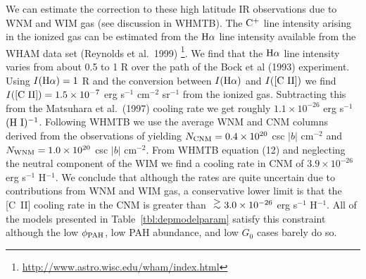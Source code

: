 \documentclass[12pt,preprint,flushrt]{aastex}
\newcommand{\ag}{\mbox{ \raisebox{-.4ex}{$\stackrel{\textstyle >}{\sim}$} }}
\begin{document}
We can estimate the correction to these high latitude IR observations 
due to WNM and WIM gas (see discussion in WHMTB). The ${\rm C^+}$
line intensity arising in the ionized gas can be estimated from 
the ${\rm H}\alpha$ line intensity available from the WHAM data set
(Reynolds et al.\ 1999)
\footnote{\url{ http://www.astro.wisc.edu/wham/index.html}}. 
We find that the ${\rm H}\alpha$ line intensity
varies from about 0.5 to 1 R over the path of the Bock et al (1993) 
experiment. Using $I({\rm H}\alpha) = 1$ R  and the conversion between
$I({\rm H}\alpha)$ and $I([{\rm C~II]})$ \cite[e.g.,][]{rey92} we find
$I({\rm [C~II]}) = 1.5\times 10^{-7}$  
erg s$^{-1}$ cm$^{-2}$ sr$^{-1}$ from the
ionized gas. Subtracting this from the Matsuhara et al.\ (1997)
cooling rate we get roughly $1.1\times 10^{-26}$ erg s$^{-1}$ 
$({\rm H~I})^{-1}$. Following WHMTB we use the average WNM and 
CNM columns derived from the observations of
\cite{kul85} yielding
$N_{\rm CNM} = 0.4\times 10^{20}$ csc $|b|$ cm$^{-2}$ 
and
$N_{\rm WNM} = 1.0\times 10^{20}$ csc $|b|$ cm$^{-2}$. From
WHMTB equation (12) and
neglecting the neutral component of the WIM we find a cooling rate
in CNM of $3.9\times 10^{-26}$ erg s$^{-1}$ H$^{-1}$.
We conclude that although the rates are quite uncertain
 due to contributions from  WNM and WIM gas, a conservative lower limit is 
that the [C~II] cooling rate in the CNM is 
greater than $\ag 3.0\times 10^{-26}$ erg s$^{-1}$ H$^{-1}$.
All of the models presented in Table~\ref{tbl:depmodelparam} 
satisfy this constraint although the low $\phi_{\rm PAH}$,
low PAH abundance, and low $G_0$ cases barely do so. 
\end{document}
